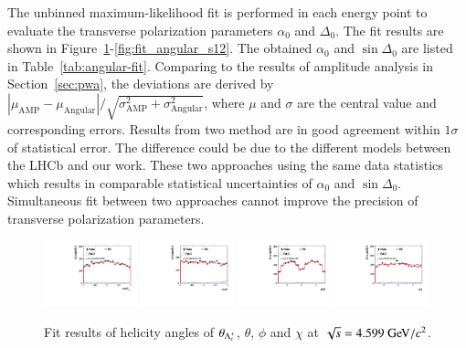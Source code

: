 The unbinned maximum-likelihood fit is performed in each energy point to evaluate the transverse polarization parameters $\alpha_0$ and $\Delta_0$. The fit results are shown in Figure~\ref{fig:fit_angular_s0}-\ref{fig:fit_angular_s12}. The obtained $\alpha_0$ and $\sin\Delta_0$ are listed in Table~\ref{tab:angular-fit}. Comparing to the results of amplitude analysis in Section~\ref{sec:pwa}, the deviations are derived by $|\mu_\mathrm{AMP} - \mu_\mathrm{Angular}|/\sqrt{\sigma_\mathrm{AMP}^2 + \sigma_\mathrm{Angular}^2}$, where $\mu$ and $\sigma$ are the central value and corresponding errors. Results from two method are in good agreement within $1\sigma$ of statistical error. The difference could be due to the different models between the LHCb and our work. These two approaches using the same data statistics which results in comparable statistical uncertainties of $\alpha_0$ and $\sin\Delta_0$. Simultaneous fit between two approaches cannot improve the precision of transverse polarization parameters.

\begin{figure}[H]\centering
    \includegraphics[width=0.24\textwidth]{figure/polarimetery/angular_plots/pkpi_4600_cos_theta0.pdf}
    \includegraphics[width=0.24\textwidth]{figure/polarimetery/angular_plots/pkpi_4600_cos_theta1.pdf}
    \includegraphics[width=0.24\textwidth]{figure/polarimetery/angular_plots/pkpi_4600_phi1.pdf}
    \includegraphics[width=0.24\textwidth]{figure/polarimetery/angular_plots/pkpi_4600_phi2.pdf}
    \caption{Fit results of helicity angles of $\theta_{\Lambda_{c}^{+}}$, $\theta$, $\phi$ and $\chi$ at $\sqrt{s} = 4.599\gev/c^2$.}
\label{fig:fit_angular_s0}
\end{figure}

